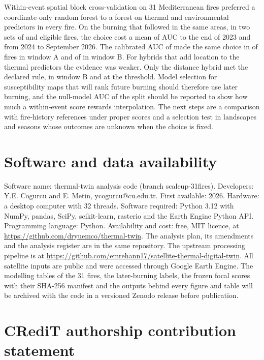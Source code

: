 \documentclass[preprint,12pt,authoryear]{elsarticle}
\begin{document}
Within-event spatial block cross-validation on 31 Mediterranean fires preferred a coordinate-only random forest to a forest on thermal and environmental predictors in every fire. On the burning that followed in the same areas, in two sets of \sAElig{} and \sBElig{} eligible fires, the choice cost a mean of \sACrfLossAuc{} AUC to the end of 2023 and \sBCrfLossAuc{} from 2024 to September 2026. The calibrated AUC of \citet{Hijmans2012} made the same choice in \sACrfChCauc{} of \sAElig{} fires in window A and \sBCrfChCauc{} of \sBElig{} in window B. For hybrids that add location to the thermal predictors the evidence was weaker. Only the distance hybrid met the declared rule, in window B and at the threshold. Model selection for susceptibility maps that will rank future burning should therefore use later burning, and the null-model AUC of the split should be reported to show how much a within-event score rewards interpolation. The next steps are a comparison with fire-history references under proper scores and a selection test in landscapes and seasons whose outcomes are unknown when the choice is fixed.

\section*{Software and data availability}
\label{sec:software}

Software name: thermal-twin analysis code (branch scaleup-31fires). Developers: Y.E. Cogurcu and E. Metin, ycogurcu@cu.edu.tr. First available: 2026. Hardware: a desktop computer with 32 threads. Software required: Python 3.12 with NumPy, pandas, SciPy, scikit-learn, rasterio and the Earth Engine Python API. Programming language: Python. Availability and cost: free, MIT licence, at \url{https://github.com/dryuemco/thermal-twin}. The analysis plan, its amendments and the analysis register are in the same repository. The upstream processing pipeline is at \url{https://github.com/emrehann17/satellite-thermal-digital-twin}. All satellite inputs are public and were accessed through Google Earth Engine. The modelling tables of the 31 fires, the later-burning labels, the frozen focal scores with their SHA-256 manifest and the outputs behind every figure and table will be archived with the code in a versioned Zenodo release before publication.

\section*{CRediT authorship contribution statement}
\end{document}
